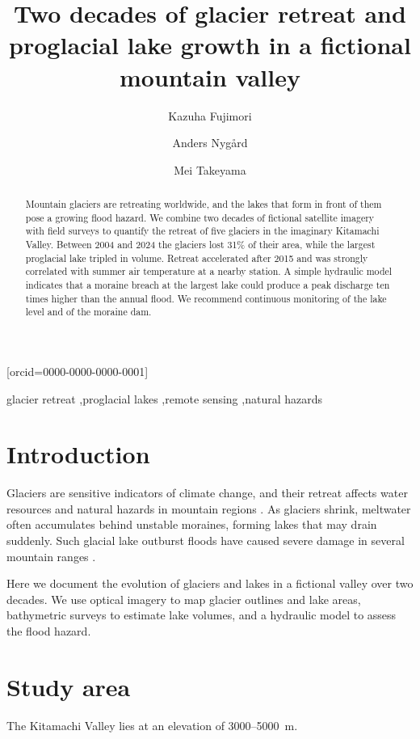 \documentclass[a4paper,fleqn]{cas-dc}
\begin{document}
\let\WriteBookmarks\relax
{}
\title [mode = title]{Two decades of glacier retreat and proglacial lake growth in a fictional mountain valley}
\author[1]{Kazuha Fujimori}[orcid=0000-0000-0000-0001]
\cormark[1]
\author[2]{Anders Nyg{\aa}rd}
\author[1]{Mei Takeyama}
\begin{abstract}
Mountain glaciers are retreating worldwide, and the lakes that form in front of them pose a growing flood hazard.
We combine two decades of fictional satellite imagery with field surveys to quantify the retreat of five glaciers in the imaginary Kitamachi Valley.
Between 2004 and 2024 the glaciers lost 31\% of their area, while the largest proglacial lake tripled in volume.
Retreat accelerated after 2015 and was strongly correlated with summer air temperature at a nearby station.
A simple hydraulic model indicates that a moraine breach at the largest lake could produce a peak discharge ten times higher than the annual flood.
We recommend continuous monitoring of the lake level and of the moraine dam.
\end{abstract}
\begin{keywords}
glacier retreat \sep proglacial lakes \sep remote sensing \sep natural hazards
\end{keywords}
\maketitle
\section{Introduction}
Glaciers are sensitive indicators of climate change, and their retreat affects water resources and natural hazards in mountain regions \citep{fujimori2021,nygaard2022}.
As glaciers shrink, meltwater often accumulates behind unstable moraines, forming lakes that may drain suddenly.
Such glacial lake outburst floods have caused severe damage in several mountain ranges \citep{takeyama2023}.

Here we document the evolution of glaciers and lakes in a fictional valley over two decades.
We use optical imagery to map glacier outlines and lake areas, bathymetric surveys to estimate lake volumes, and a hydraulic model to assess the flood hazard.

\section{Study area}
The Kitamachi Valley lies at an elevation of 3000--5000~m.


\end{document}
